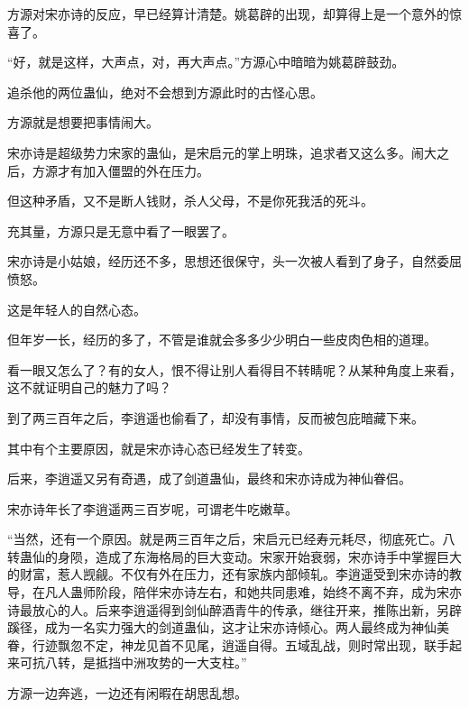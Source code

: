 \begin{this_body}
方源对宋亦诗的反应，早已经算计清楚。姚葛辟的出现，却算得上是一个意外的惊喜了。

“好，就是这样，大声点，对，再大声点。”方源心中暗暗为姚葛辟鼓劲。

追杀他的两位蛊仙，绝对不会想到方源此时的古怪心思。

方源就是想要把事情闹大。

宋亦诗是超级势力宋家的蛊仙，是宋启元的掌上明珠，追求者又这么多。闹大之后，方源才有加入僵盟的外在压力。

但这种矛盾，又不是断人钱财，杀人父母，不是你死我活的死斗。

充其量，方源只是无意中看了一眼罢了。

宋亦诗是小姑娘，经历还不多，思想还很保守，头一次被人看到了身子，自然委屈愤怒。

这是年轻人的自然心态。

但年岁一长，经历的多了，不管是谁就会多多少少明白一些皮肉色相的道理。

看一眼又怎么了？有的女人，恨不得让别人看得目不转睛呢？从某种角度上来看，这不就证明自己的魅力了吗？

到了两三百年之后，李逍遥也偷看了，却没有事情，反而被包庇暗藏下来。

其中有个主要原因，就是宋亦诗心态已经发生了转变。

后来，李逍遥又另有奇遇，成了剑道蛊仙，最终和宋亦诗成为神仙眷侣。

宋亦诗年长了李逍遥两三百岁呢，可谓老牛吃嫩草。

“当然，还有一个原因。就是两三百年之后，宋启元已经寿元耗尽，彻底死亡。八转蛊仙的身陨，造成了东海格局的巨大变动。宋家开始衰弱，宋亦诗手中掌握巨大的财富，惹人觊觎。不仅有外在压力，还有家族内部倾轧。李逍遥受到宋亦诗的教导，在凡人蛊师阶段，陪伴宋亦诗左右，和她共同患难，始终不离不弃，成为宋亦诗最放心的人。后来李逍遥得到剑仙醉酒青牛的传承，继往开来，推陈出新，另辟蹊径，成为一名实力强大的剑道蛊仙，这才让宋亦诗倾心。两人最终成为神仙美眷，行迹飘忽不定，神龙见首不见尾，逍遥自得。五域乱战，则时常出现，联手起来可抗八转，是抵挡中洲攻势的一大支柱。”

方源一边奔逃，一边还有闲暇在胡思乱想。

\end{this_body}

